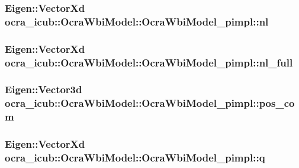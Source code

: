 \hypertarget{structOcraWbiModel_1_1OcraWbiModel__pimpl_aabdfee290923f49af80f11c524bae456}{
\subsubsection[{nl}]{\setlength{\rightskip}{0pt plus 5cm}\-Eigen\-::\-Vector\-Xd {\bf ocra\-\_\-icub\-::\-Ocra\-Wbi\-Model\-::\-Ocra\-Wbi\-Model\-\_\-pimpl\-::nl}}}\label{structOcraWbiModel_1_1OcraWbiModel__pimpl_aabdfee290923f49af80f11c524bae456}
\hypertarget{structOcraWbiModel_1_1OcraWbiModel__pimpl_abea2880fe7e4fa2672ce55635ab9ea6c}{
\subsubsection[{nl\-\_\-full}]{\setlength{\rightskip}{0pt plus 5cm}\-Eigen\-::\-Vector\-Xd {\bf ocra\-\_\-icub\-::\-Ocra\-Wbi\-Model\-::\-Ocra\-Wbi\-Model\-\_\-pimpl\-::nl\-\_\-full}}}\label{structOcraWbiModel_1_1OcraWbiModel__pimpl_abea2880fe7e4fa2672ce55635ab9ea6c}
\hypertarget{structOcraWbiModel_1_1OcraWbiModel__pimpl_acc028d57a70c3b36838f28ea518f65c4}{
\subsubsection[{pos\-\_\-com}]{\setlength{\rightskip}{0pt plus 5cm}\-Eigen\-::\-Vector3d {\bf ocra\-\_\-icub\-::\-Ocra\-Wbi\-Model\-::\-Ocra\-Wbi\-Model\-\_\-pimpl\-::pos\-\_\-com}}}\label{structOcraWbiModel_1_1OcraWbiModel__pimpl_acc028d57a70c3b36838f28ea518f65c4}
\hypertarget{structOcraWbiModel_1_1OcraWbiModel__pimpl_a1f83373b2d975e1882ee7812215df997}{
\subsubsection[{q}]{\setlength{\rightskip}{0pt plus 5cm}\-Eigen\-::\-Vector\-Xd {\bf ocra\-\_\-icub\-::\-Ocra\-Wbi\-Model\-::\-Ocra\-Wbi\-Model\-\_\-pimpl\-::q}}}\label{structOcraWbiModel_1_1OcraWbiModel__pimpl_a1f83373b2d975e1882ee7812215df997}
